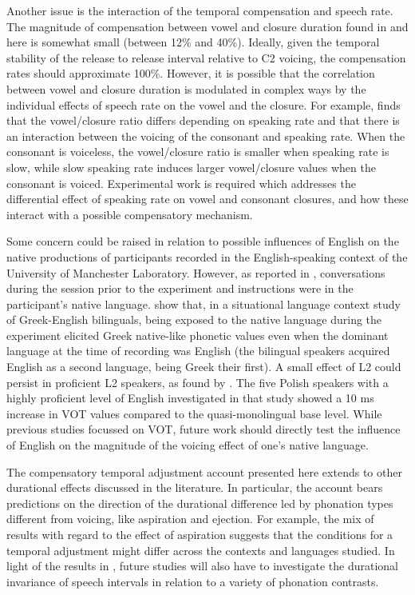 \documentclass[charis]{glossa}
\begin{document}
Another issue is the interaction of the temporal compensation and speech
rate. The magnitude of compensation between vowel and closure duration
found in \citet{de-jong1991} and here is somewhat small (between 12\%
and 40\%). Ideally, given the temporal stability of the release to
release interval relative to C2 voicing, the compensation rates should
approximate 100\%. However, it is possible that the correlation between
vowel and closure duration is modulated in complex ways by the
individual effects of speech rate on the vowel and the closure. For
example, \citet{ko2018} finds that the vowel/closure ratio differs
depending on speaking rate and that there is an interaction between the
voicing of the consonant and speaking rate. When the consonant is
voiceless, the vowel/closure ratio is smaller when speaking rate is
slow, while slow speaking rate induces larger vowel/closure values when
the consonant is voiced. Experimental work is required which addresses
the differential effect of speaking rate on vowel and consonant
closures, and how these interact with a possible compensatory mechanism.

Some concern could be raised in relation to possible influences of
English on the native productions of participants recorded in the
English-speaking context of the University of Manchester Laboratory.
However, as reported in , conversations during the
session prior to the experiment and instructions were in the
participant's native language. \citet{antoniou2010} show that, in a
situational language context study of Greek-English bilinguals, being
exposed to the native language during the experiment elicited Greek
native-like phonetic values even when the dominant language at the time
of recording was English (the bilingual speakers acquired English as a
second language, being Greek their first). A small effect of L2 could
persist in proficient L2 speakers, as found by \citet{schwartz2015}. The
five Polish speakers with a highly proficient level of English
investigated in that study showed a 10 ms increase in VOT values
compared to the quasi-monolingual base level. While previous studies
focussed on VOT, future work should directly test the influence of
English on the magnitude of the voicing effect of one's native language.

The compensatory temporal adjustment account presented here extends to
other durational effects discussed in the literature. In particular, the
account bears predictions on the direction of the durational difference
led by phonation types different from voicing, like aspiration and
ejection. For example, the mix of results with regard to the effect of
aspiration \citep{durvasula2012} suggests that the conditions for a
temporal adjustment might differ across the contexts and languages
studied. In light of the results in \citet{begus2017}, future studies
will also have to investigate the durational invariance of speech
intervals in relation to a variety of phonation contrasts.
\end{document}
